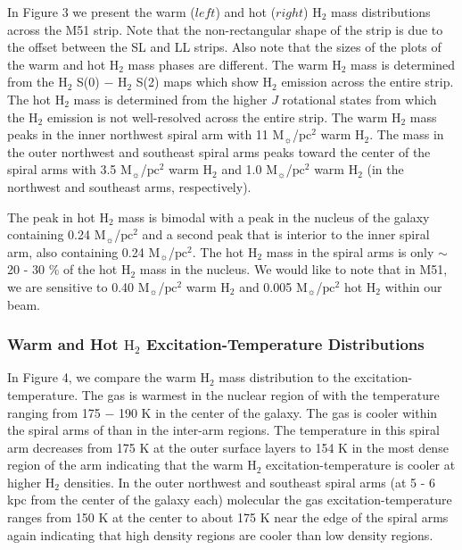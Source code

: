 \documentclass[manuscript]{aastex}
\begin{document}
In Figure 3 we present the warm ($left$) and hot ($right$) $\mathrm{H_2}$ mass distributions across the M51 strip.  Note that the non-rectangular shape of the strip is due to the offset between the SL and LL strips.  Also note that the sizes of the plots of the warm and hot $\mathrm{H_2}$ mass phases are different.  The warm $\mathrm{H_2}$ mass is determined from the $\mathrm{H_2}$ S(0) $-$ $\mathrm{H_2}$ S(2) maps which show $\mathrm{H_2}$ emission across the entire strip.  The hot $\mathrm{H_2}$ mass is determined from the higher $J$ rotational states from which the $\mathrm{H_2}$ emission is not well-resolved across the entire strip.  The warm $\mathrm{H_2}$ mass peaks in the inner northwest spiral arm with 11 $\mathrm{M_\sun}$/$\mathrm{pc^2}$ warm $\mathrm{H_2}$. The mass in the outer northwest and southeast spiral arms 
peaks toward the center of the spiral arms with 3.5 $\mathrm{M_\sun}$/$\mathrm{pc^2}$ warm $\mathrm{H_2}$ and 1.0 $\mathrm{M_\sun}$/$\mathrm{pc^2}$ warm $\mathrm{H_2}$ (in the northwest and southeast arms, respectively).

The peak in hot $\mathrm{H_2}$ mass is bimodal with a peak in the nucleus of the galaxy containing 0.24 $\mathrm{M_\sun}$/$\mathrm{pc^2}$ and a second peak that is interior to the inner spiral arm, also containing 0.24 $\mathrm{M_\sun}$/$\mathrm{pc^2}$.  The hot $\mathrm{H_2}$ mass in the spiral arms is only $\sim$ 20 - 30 \% of the hot $\mathrm{H_2}$ mass in the nucleus.
We would like to note that in M51, 
we are sensitive to 
0.40 $\mathrm{M_\sun}$/$\mathrm{pc^2}$ warm $\mathrm{H_2}$ and 0.005 $\mathrm{M_\sun}$/$\mathrm{pc^2}$ hot $\mathrm{H_2}$ within our beam.

\subsubsection{Warm and Hot $\mathrm{H_2}$ Excitation-Temperature Distributions}

In Figure 4, we compare the warm $\mathrm{H_2}$ mass distribution to the excitation-temperature.  The gas is warmest in the nuclear region of  with the temperature ranging from 175 $-$ 190 K in the center of the galaxy.  The gas is cooler within the spiral arms of  than in the inter-arm regions.  The temperature in this spiral arm decreases from 175 K at the outer surface layers to 154 K in the most dense region of the arm indicating that the warm $\mathrm{H_2}$ excitation-temperature is cooler at higher $\mathrm{H_2}$ densities.  In the outer northwest and southeast spiral arms (at 5 - 6 kpc from the center of the galaxy each) molecular the gas excitation-temperature ranges from 150 K at the center to about 175 K near the edge of the spiral arms again indicating that high density regions are cooler than low density regions.  
\end{document}
